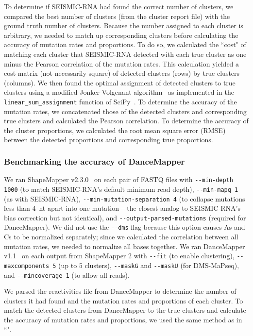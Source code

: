 \documentclass[11pt]{article}
\begin{document}
To determine if SEISMIC-RNA had found the correct number of clusters, we compared the best number of clusters (from the cluster report file) with the ground truth number of clusters.
Because the number assigned to each cluster is arbitrary, we needed to match up corresponding clusters before calculating the accuracy of mutation rates and proportions.
To do so, we calculated the ``cost" of matching each cluster that SEISMIC-RNA detected with each true cluster as one minus the Pearson correlation of the mutation rates.
This calculation yielded a cost matrix (not necessarily square) of detected clusters (rows) by true clusters (columns).
We then found the optimal assignment of detected clusters to true clusters using a modified Jonker-Volgenant algorithm~\cite{Crouse2016} as implemented in the \verb|linear_sum_assignment| function of SciPy~\cite{Virtanen2020}.
To determine the accuracy of the mutation rates, we concatenated those of the detected clusters and corresponding true clusters and calculated the Pearson correlation.
To determine the accuracy of the cluster proportions, we calculated the root mean square error (RMSE) between the detected proportions and corresponding true proportions.

\subsubsection{Benchmarking the accuracy of DanceMapper}

We ran ShapeMapper v2.3.0~\cite{Busan2018} on each pair of FASTQ files with \verb|--min-depth 1000| (to match SEISMIC-RNA's default minimum read depth), \verb|--min-mapq 1| (as with SEISMIC-RNA), \verb|--min-mutation-separation 4| (to collapse mutations less than 4~nt apart into one mutation -- the closest analog to SEISMIC-RNA's bias correction but not identical), and \verb|--output-parsed-mutations| (required for DanceMapper).
We did not use the \verb|--dms| flag because this option causes As and Cs to be normalized separately; since we calculated the correlation between all mutation rates, we needed to normalize all bases together.
We ran DanceMapper v1.1~\cite{Olson2022} on each output from ShapeMapper 2 with \verb|--fit| (to enable clustering), \verb|--maxcomponents 5| (up to 5 clusters), \verb|--maskG| and \verb|--maskU| (for DMS-MaPseq), and \verb|--mincoverage 1| (to allow all reads).

We parsed the reactivities file from DanceMapper to determine the number of clusters it had found and the mutation rates and proportions of each cluster.
To match the detected clusters from DanceMapper to the true clusters and calculate the accuracy of mutation rates and proportions, we used the same method as in ``".
\end{document}
